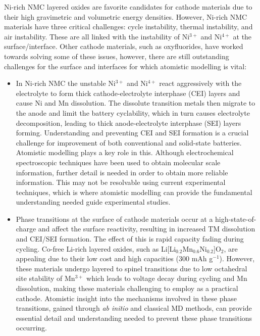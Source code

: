 \documentclass[../main.tex]{subfiles}
\begin{document}
Ni-rich NMC layered oxides are favorite candidates for cathode materials due to their high gravimetric and volumetric energy densities.\cite{li2020high} However, Ni-rich NMC materials have three critical challenges: cycle instability, thermal instability, and air instability. These are all linked with the instability of Ni$^{3+}$ and Ni$^{4+}$ at the surface/interface. Other cathode materials, such as oxyfluorides, have worked towards solving some of these issues, however, there are still outstanding challenges for the surface and interfaces for which atomistic modelling is vital:
\begin{itemize}
    \item In Ni-rich NMC the unstable Ni$^{3+}$ and Ni$^{4+}$ react aggressively with the electrolyte to form thick cathode-electrolyte interphase (CEI) layers and cause Ni and Mn dissolution. The dissolute transition metals then migrate to the anode and limit the battery cyclability, \cite{li2017dynamic,li2018mn} which in turn causes electrolyte decomposition, leading to thick anode-electrolyte interphase (SEI) layers forming. Understanding and preventing CEI and SEI formation is a crucial challenge for improvement of both conventional and solid-state batteries. Atomistic modelling plays a key role in this. Although electrochemical spectroscopic techniques have been used to obtain molecular scale information, further detail is needed in order to obtain more reliable information. This may not be resolvable using current experimental techniques, which is where atomistic modelling can provide the fundamental understanding needed guide experimental studies.
    \item Phase transitions at the surface of cathode materials occur at a high-state-of-charge and affect the surface reactivity, resulting in increased TM dissolution and CEI/SEI formation. The effect of this is rapid capacity fading during cycling. \cite{li2019comprehensive} Co-free Li-rich layered oxides, such as Li[Li$_{0.2}$Mn$_{0.6}$Ni$_{0.2}$]O$_{2}$, are appealing due to their low cost and high capacities (300 mAh g$^{-1}$). \cite{kim2004electrochemical,armstrong2006demonstrating} However, these materials undergo layered to spinel transitions due to low octahedral site stability of Mn$^{3+}$ which leads to voltage decay during cycling and Mn dissolution,\cite{MnDissolution2016} making these materials challenging to employ as a practical cathode. Atomistic insight into the mechanisms involved in these phase transitions, gained through \textit{ab initio} and classical MD methods, can provide essential detail and understanding needed to prevent these phase transitions occurring.

\end{itemize}
\end{document}
